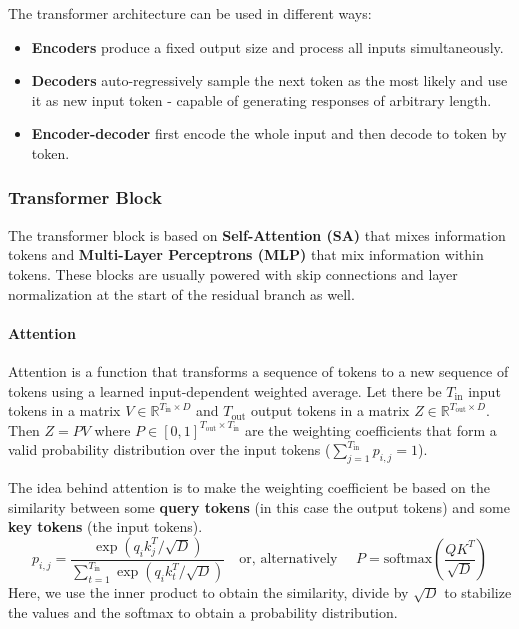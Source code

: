 \documentclass{article}
\newcommand{\R}{\mathbb{R}}
\begin{document}
The transformer architecture can be used in different ways:
\begin{itemize}
    \item \textbf{Encoders} produce a fixed output size and process all inputs simultaneously.
    \item \textbf{Decoders} auto-regressively sample the next token as the most likely and use it as new input token - capable of generating responses of arbitrary length.
    \item \textbf{Encoder-decoder} first encode the whole input and then decode to token by token.
\end{itemize}

\subsubsection{Transformer Block}

The transformer block is based on \textbf{Self-Attention (SA)} that mixes information tokens and \textbf{Multi-Layer Perceptrons (MLP)} that mix information within tokens.
These blocks are usually powered with skip connections and layer normalization at the start of the residual branch as well.

\paragraph{Attention}

Attention is a function that transforms a sequence of tokens to a new sequence of tokens using a learned input-dependent weighted average.
Let there be $T_\text{in}$ input tokens in a matrix $V \in \R^{T_\text{in} \times D}$ and $T_\text{out}$ output tokens in a matrix $Z \in \R^{T_\text{out} \times D}$.
Then $Z = PV$ where $P \in [0,1]^{T_\text{out} \times T_\text{in}}$ are the weighting coefficients that form a valid probability distribution over the input tokens ($\sum_{j=1}^{T_\text{in}} p_{i,j} = 1$).

The idea behind attention is to make the weighting coefficient be based on the similarity between some \textbf{query tokens} (in this case the output tokens) and some \textbf{key tokens} (the input tokens).
$$
p_{i,j} = \frac{\exp(q_i k_j^T / \sqrt{D})}{\sum_{t=1}^{T_\text{in}} \exp \left( q_i k_t^T / \sqrt{D} \right)}
\quad \text {or, alternatively } \quad
P = \text{softmax}\left( \frac{QK^T}{\sqrt{D}} \right)
$$
Here, we use the inner product to obtain the similarity, divide by $\sqrt{D}$ to stabilize the values and the softmax to obtain a probability distribution. 
\end{document}
